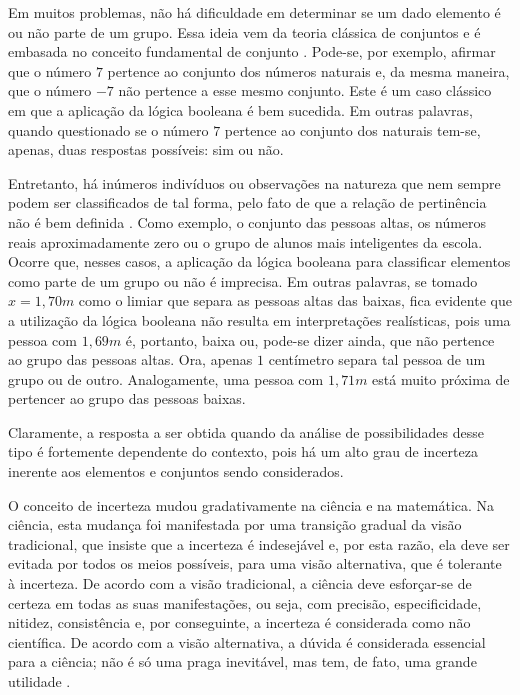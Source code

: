 Em muitos problemas, não há dificuldade em determinar se um dado elemento é ou não parte de um grupo. Essa ideia vem da teoria clássica de conjuntos e é embasada no conceito fundamental de conjunto \citep{chen:00}. Pode-se, por exemplo, afirmar que o número $7$ pertence ao conjunto dos números naturais e, da mesma maneira, que o número $-7$ não pertence a esse mesmo conjunto. Este é um caso clássico em que a aplicação da lógica booleana é bem sucedida. Em outras palavras, quando questionado se o número $7$ pertence ao conjunto dos naturais tem-se, apenas, duas respostas possíveis: sim ou não.

Entretanto, há inúmeros indivíduos ou observações na natureza que nem sempre podem ser classificados de tal forma, pelo fato de que a relação de pertinência não é bem definida \citep{pedrycz:98}. Como exemplo, o conjunto das pessoas altas, os números reais aproximadamente zero ou o grupo de alunos mais inteligentes da escola. Ocorre que, nesses casos, a aplicação da lógica booleana para classificar elementos como parte de um grupo ou não é imprecisa. Em outras palavras, se tomado $x = 1,70m$ como o limiar que separa as pessoas altas das baixas, fica evidente que a utilização da lógica booleana não resulta em interpretações realísticas, pois uma pessoa com $1,69m$ é, portanto, baixa ou, pode-se dizer ainda, que não pertence ao grupo das pessoas altas. Ora, apenas $1$ centímetro separa tal pessoa de um grupo ou de outro. Analogamente, uma pessoa com $1,71m$ está muito próxima de pertencer ao grupo das pessoas baixas.

Claramente, a resposta a ser obtida quando da análise de possibilidades desse tipo é fortemente dependente do contexto, pois há um alto grau de incerteza inerente aos elementos e conjuntos sendo considerados.

O conceito de incerteza mudou gradativamente na ciência e na matemática. Na ciência, esta mudança foi manifestada por uma transição gradual da visão tradicional, que insiste que a incerteza é indesejável e, por esta razão, ela deve ser evitada por todos os meios possíveis, para uma visão alternativa, que é tolerante à incerteza. De acordo com a visão tradicional, a ciência deve esforçar-se de certeza em todas as suas manifestações, ou seja, com precisão, especificidade, nitidez, consistência e, por conseguinte, a incerteza é considerada como não científica. De acordo com a visão alternativa, a dúvida é considerada essencial para a ciência; não é só uma praga inevitável, mas tem, de fato, uma grande utilidade \citep{klir:95}.

